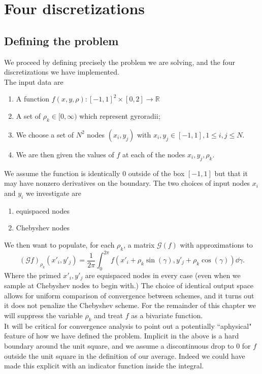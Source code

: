 \chapter{Four discretizations\label{chap:discretizations}}

\section{Defining the problem\label{sec:ProblemDefinition}}
We proceed by defining precisely the problem we are solving, and the four discretizations we have implemented.\\

The input data are 
\begin{enumerate}
	\item A function $f(x,y,\rho) : [-1,1]^2 \times [0,2]  \to \mathbb{R}$
	\item A set of $\rho_k \in [0,\infty)$ which represent gyroradii;
	\item  We choose a set of $N^2$ nodes $(x_i,y_j)$ with $x_i, y_j\in [-1,1], 1 \leq i,j \leq N$.   
	\item We are then given the values of $f$ at each of the nodes $x_i,y_j,\rho_k$. 
\end{enumerate}

    We assume the function is identically $0$ outside of the box $[-1,1]$ but that it may have nonzero derivatives on the boundary.  The two choices of input nodes $x_i$ and $y_i$ we investigate are 
    \begin{enumerate}
    	\item equispaced nodes
    	\item Chebyshev nodes
    \end{enumerate} 

We then want to populate, for each $\rho_k$, a matrix $\mathcal{G}(f)$ with approximations to 
\[ (\mathcal{G}f)_{\rho_k}(x'_i,y'_j) = \frac{1}{2 \pi}\int_{0}^{2\pi} f(x'_i+\rho_k \sin(\gamma), y'_j + \rho_k \cos(\gamma)) \dd{\gamma}.\]
Where the primed $x'_i, y'_j$ are equispaced nodes in every case (even when we sample at Chebyshev nodes to begin with.)  The choice of identical output space allows for uniform comparison of convergence between schemes, and it turns out it does not penalize the Chebyshev scheme.  For the remainder of this chapter we will suppress the variable $\rho_k$ and treat $f$ as a bivariate function.\\

It will be critical for convergence analysis to point out a potentially ``aphysical" feature of how we have defined the problem.  Implicit in the above is a hard boundary around the unit square, and we assume a discontinuous drop to 0 for $f$ outside the unit square in the definition of our average.  Indeed we could have made this explicit with an indicator function inside the integral.  \\

